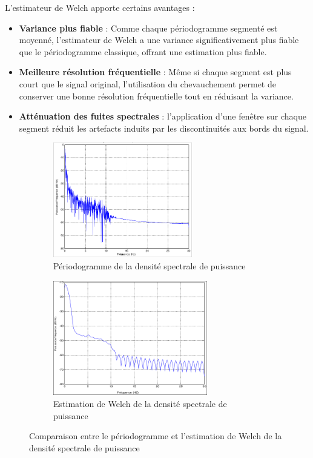L'estimateur de Welch apporte certains avantages : 
\begin{itemize}
    \item  \textbf{Variance plus fiable} : Comme chaque périodogramme segmenté est moyenné, l'estimateur de Welch a une variance significativement plus fiable que le périodogramme classique, offrant une estimation plus fiable.
    \item \textbf{Meilleure résolution fréquentielle} : Même si chaque segment est plus court que le signal original, l'utilisation du chevauchement permet de conserver une bonne résolution fréquentielle tout en réduisant la variance.
    \item  \textbf{Atténuation des fuites spectrales} : l'application d'une fenêtre sur chaque segment réduit les artefacts induits par les discontinuités aux bords du signal.
\end{itemize}

\begin{figure}[H]
    \centering
    \begin{subfigure}[b]{0.45\textwidth}
        \centering
        \includegraphics[height=5cm]{images/methode/periodogramme.png}
        \caption{Périodogramme de la densité spectrale de puissance}\label{fig:periodogramme}
    \end{subfigure}
    \begin{subfigure}[b]{0.45\textwidth}
        \centering
        \includegraphics[height=5cm]{images/methode/welch.png}
        \caption{Estimation de Welch de la densité spectrale de puissance}\label{fig:welch}
    \end{subfigure}
    \caption{Comparaison entre le périodogramme et l'estimation de Welch de la densité spectrale de puissance}\label{fig:periodogramme_welch}
\end{figure}

